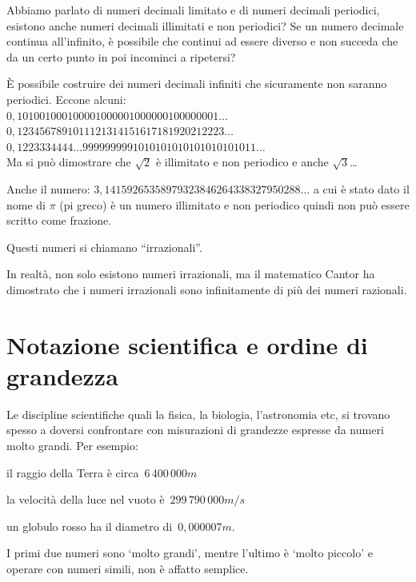 \begin{osservazione}
 Abbiamo parlato di numeri decimali limitato e di numeri decimali 
periodici, esistono anche numeri decimali illimitati e non periodici?
Se un numero decimale continua all'infinito, è possibile che continui ad 
essere diverso e non succeda che da un certo punto in poi incominci a 
ripetersi?

È possibile costruire dei numeri decimali infiniti che sicuramente non 
saranno periodici. Eccone alcuni:\\
\(0,101001000100001000001000000100000001\dots\)\\
\(0,1234567891011121314151617181920212223\dots\)\\
\(0,1223334444\dots9999999991010101010101010101011\dots\)\\
Ma si può dimostrare che \(\sqrt{2}\) è illimitato e non periodico
e anche \(\sqrt{3}\)\dots 

Anche il numero: \(3,14159265358979323846264338327950288\dots\) a cui è 
stato dato il nome di \(\pi\) (pi greco) è un numero 
illimitato e non periodico quindi non può essere scritto come frazione.

Questi numeri si chiamano ``irrazionali''.

In realtà, non solo esistono numeri irrazionali, ma il matematico Cantor ha 
dimostrato che i numeri irrazionali sono infinitamente di più dei numeri 
razionali.
\end{osservazione}

\section{Notazione scientifica e ordine di grandezza}
\label{sec:razionali_notazione_scientifica}

Le discipline scientifiche quali la fisica, la biologia, l'astronomia etc,
si trovano spesso a doversi confrontare con misurazioni di grandezze 
espresse 
da numeri molto grandi. Per esempio:

\begin{itemize*}
\item il raggio della Terra è circa~\(6\,400\,000\unit{m}\)
\item la velocità della luce nel vuoto è~\(299\,790\,000\unit{m/s}\)
\item un globulo rosso ha il diametro di~\(0,000007\unit{m}\).
\end{itemize*}

I primi due numeri sono `molto grandi', mentre l'ultimo è `molto piccolo' e 
operare con numeri simili, non è affatto semplice.

